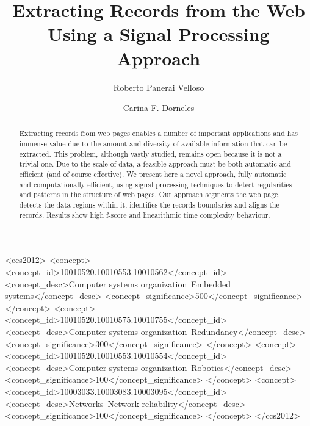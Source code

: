 \documentclass[sigconf]{acmart}
\begin{document}
\title{Extracting Records from the Web Using a Signal Processing Approach}

\author{Roberto Panerai Velloso}

\author{Carina F. Dorneles}

\begin{abstract}
Extracting records from web pages enables a number of important
applications and has immense value due to the amount and diversity of
available information that can be extracted. This problem, although vastly
studied, remains open because it is not a trivial one. Due to the scale of data,
a feasible approach must be both automatic and efficient (and of course
effective). We present here a novel approach, fully automatic and
computationally efficient, using signal processing techniques to detect
regularities and patterns in the structure of web pages. Our approach segments
the web page, detects the data regions within it, identifies the records
boundaries and aligns the records. Results show high f-score and
linearithmic time complexity behaviour.
\end{abstract}

%
%
\begin{CCSXML}
<ccs2012>
 <concept>
  <concept_id>10010520.10010553.10010562</concept_id>
  <concept_desc>Computer systems organization~Embedded systems</concept_desc>
  <concept_significance>500</concept_significance>
 </concept>
 <concept>
  <concept_id>10010520.10010575.10010755</concept_id>
  <concept_desc>Computer systems organization~Redundancy</concept_desc>
  <concept_significance>300</concept_significance>
 </concept>
 <concept>
  <concept_id>10010520.10010553.10010554</concept_id>
  <concept_desc>Computer systems organization~Robotics</concept_desc>
  <concept_significance>100</concept_significance>
 </concept>
 <concept>
  <concept_id>10003033.10003083.10003095</concept_id>
  <concept_desc>Networks~Network reliability</concept_desc>
  <concept_significance>100</concept_significance>
 </concept>
</ccs2012>  
\end{CCSXML}





\maketitle




 
\end{document}
